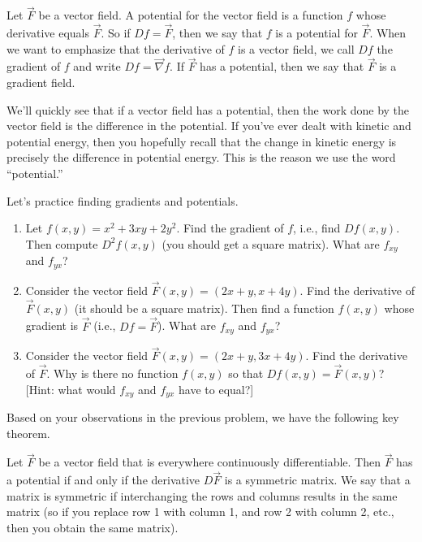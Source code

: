 \begin{definition}
%
 Let $\vec F$ be a vector field.  A potential for the vector field is a function $f$ whose derivative equals $\vec F$. So if $Df=\vec F$, then we say that $f$ is a potential for $\vec F$. When we want to emphasize that the derivative of $f$ is a vector field, we call $Df$ the gradient of $f$ and write $Df = \vec \nabla f$.
 If $\vec F$ has a potential, then we say that $\vec F$ is a gradient field. 
\end{definition}

We'll quickly see that if a vector field has a potential, then the work done by the vector field is the difference in the potential.  If you've ever dealt with kinetic and potential energy, then you hopefully recall that the change in kinetic energy is precisely the difference in potential energy.  This is the reason we use the word ``potential.''

\begin{problem}
%
Let's practice finding gradients and potentials.
\begin{enumerate}
 \item  Let $f(x,y) = x^2+3xy+2y^2$. Find the gradient of $f$, i.e., find $Df(x,y)$. Then compute $D^2f(x,y)$ (you should get a square matrix). What are $f_{xy}$ and $f_{yx}$?
 \item Consider the vector field $\vec F(x,y)=(2x+y,x+4y)$. Find the derivative of $\vec F(x,y)$ (it should be a square matrix). Then find a function $f(x,y)$ whose gradient is $\vec F$ (i.e., $Df=\vec F$). What are $f_{xy}$ and $f_{yx}$?
 \item {}%
Consider the vector field $\vec F(x,y)=(2x+y,3x+4y)$.  Find the derivative of $\vec F$.  Why is there no function $f(x,y)$ so that $Df(x,y)=\vec F(x,y)$? [Hint: what would $f_{xy}$ and $f_{yx}$ have to equal?] 
\end{enumerate}
\end{problem}

Based on your observations in the previous problem, we have the following key theorem.

\begin{theorem}
 Let $\vec F$ be a vector field that is everywhere continuously differentiable. Then $\vec F$ has a potential if and only if the derivative $D\vec F$ is a symmetric matrix. We say that a matrix is symmetric if interchanging the rows and columns results in the same matrix (so if you replace row 1 with column 1, and row 2 with column 2, etc., then you obtain the same matrix).  
\end{theorem}

